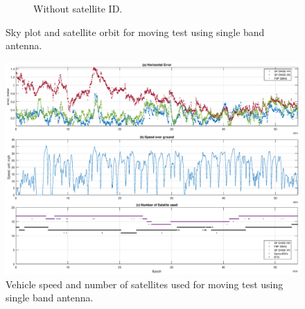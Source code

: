 \documentclass[letterpaper, 10 pt,onecolumn]{article}
\begin{document}
\begin{figure}[H]
\begin{subfigure}{.5\textwidth}
			\caption{	Without satellite ID.}
			\label{fig:mt1_obt}
		\end{subfigure}
		\caption[short]{Sky plot and satellite orbit for moving test using single band antenna.}
		\label{fig:mt1}
	\end{figure}
	
	\begin{figure}[H]
		\centering
		\includegraphics[width=\textwidth]{figures/dynamicinfo_single.eps}
		\caption{Vehicle speed and number of satellites used for moving test using single band antenna.}
		\label{fig:m1vspeed}
	\end{figure}
	
\end{document}
